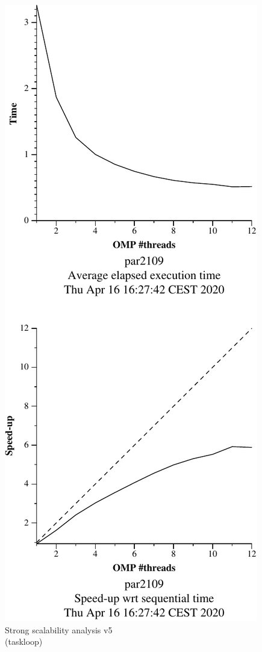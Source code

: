 \begin{figure}[H]
    \begin{minipage}{0.5\textwidth}
        \centering
        \includegraphics[width=0.7\linewidth]{plots/v5-crop.pdf}
        \caption{Strong scalability analysis v5 \\ (taskloop)}
        \label{fig:ssa_v5} 
    \end{minipage}
    \begin{minipage}{0.5\textwidth}
        \centering

\end{minipage}
\end{figure}
